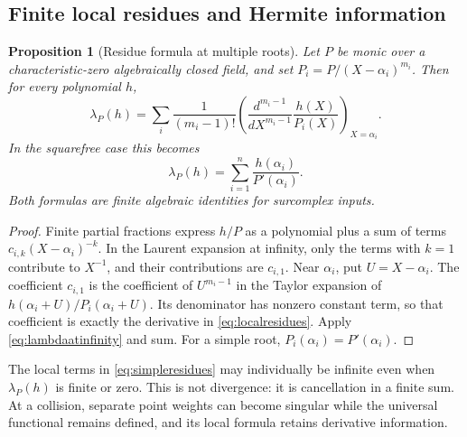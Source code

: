 \documentclass[11pt,letterpaper]{article}
\numberwithin{equation}{section}
\newtheorem{proposition}[proposition]{Proposition}
\theoremstyle{definition}
\theoremstyle{remark}
\begin{document}
\subsection{Finite local residues and Hermite information}
\begin{proposition}[Residue formula at multiple roots]\label{prop:localresidues}
Let $P$ be monic over a characteristic-zero algebraically closed field,
and set $P_i=P/(X-\alpha_i)^{m_i}$. Then for every polynomial $h$,
\begin{equation}\label{eq:localresidues}
 \lambda_P(h)=\sum_i\frac1{(m_i-1)!}
 \left(\frac{d^{m_i-1}}{dX^{m_i-1}}\frac{h(X)}{P_i(X)}
 \right)_{X=\alpha_i}.
\end{equation}
In the squarefree case this becomes
\begin{equation}\label{eq:simpleresidues}
 \lambda_P(h)=\sum_{i=1}^n\frac{h(\alpha_i)}{P'(\alpha_i)}.
\end{equation}
Both formulas are finite algebraic identities for surcomplex inputs.
\end{proposition}
\begin{proof}
Finite partial fractions express $h/P$ as a polynomial plus a sum of
terms $c_{i,k}(X-\alpha_i)^{-k}$. In the Laurent expansion at infinity,
only the terms with $k=1$ contribute to $X^{-1}$, and their contributions
are $c_{i,1}$. Near $\alpha_i$, put $U=X-\alpha_i$. The coefficient
$c_{i,1}$ is the coefficient of $U^{m_i-1}$ in the Taylor expansion of
$h(\alpha_i+U)/P_i(\alpha_i+U)$. Its denominator has nonzero constant
term, so that coefficient is exactly the derivative in
\eqref{eq:localresidues}. Apply \eqref{eq:lambdaatinfinity} and sum.
For a simple root, $P_i(\alpha_i)=P'(\alpha_i)$.
\end{proof}

The local terms in \eqref{eq:simpleresidues} may individually be infinite
even when $\lambda_P(h)$ is finite or zero. This is not divergence: it is
cancellation in a finite sum. At a collision, separate point weights can
become singular while the universal functional remains defined, and its
local formula retains derivative information.
\end{document}
